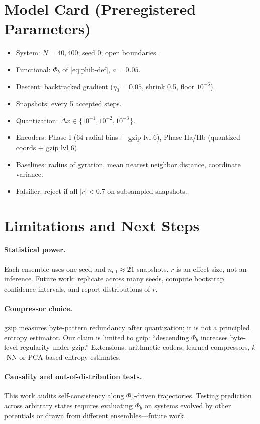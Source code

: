 \documentclass[11pt,a4paper]{article}
\numberwithin{equation}{section}
\newcommand{\phib}{\Phi_b}
\begin{document}
\section{Model Card (Preregistered Parameters)}
\begin{itemize}
\item System: $N{=}40,400$; seed 0; open boundaries.
\item Functional: $\phib$ of \cref{eq:phib-def}, $a{=}0.05$.
\item Descent: backtracked gradient ($\eta_0{=}0.05$, shrink 0.5, floor $10^{-6}$).
\item Snapshots: every 5 accepted steps.
\item Quantization: $\Delta x\in\{10^{-1},10^{-2},10^{-3}\}$.
\item Encoders: Phase I (64 radial bins + gzip lvl 6), Phase IIa/IIb (quantized coords + gzip lvl 6).
\item Baselines: radius of gyration, mean nearest neighbor distance, coordinate variance.
\item Falsifier: reject if all $|r|<0.7$ on subsampled snapshots.
\end{itemize}

\section{Limitations and Next Steps}
\paragraph{Statistical power.}
Each ensemble uses one seed and $n_{\text{eff}}\!\approx\!21$ snapshots.  $r$ is an effect size, not an inference.  Future work: replicate across many seeds, compute bootstrap confidence intervals, and report distributions of $r$.

\paragraph{Compressor choice.}
gzip measures byte-pattern redundancy after quantization; it is not a principled entropy estimator.  Our claim is limited to gzip: “descending $\phib$ increases byte-level regularity under gzip.”  Extensions: arithmetic coders, learned compressors, $k$-NN or PCA-based entropy estimates.

\paragraph{Causality and out-of-distribution tests.}
This work audits self-consistency along $\phib$-driven trajectories.  Testing prediction across arbitrary states requires evaluating $\phib$ on systems evolved by other potentials or drawn from different ensembles—future work.
\end{document}
